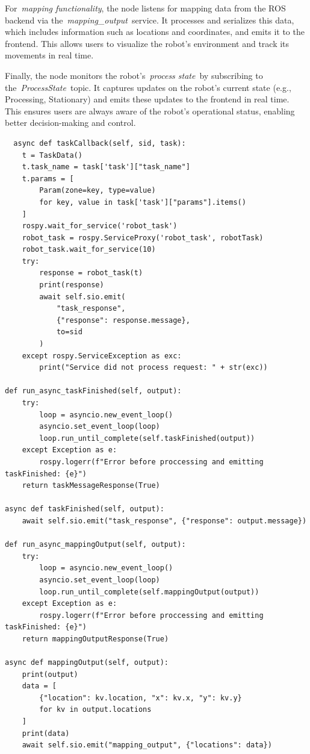 \documentclass[../../main]{subfiles}
\begin{document}
For~\emph{mapping functionality}, the node listens for mapping data from
the ROS backend via the~\emph{mapping\_output}~service. It processes and
serializes this data, which includes information such as locations and
coordinates, and emits it to the frontend. This allows users to
visualize the robot's environment and track its movements in real time.

Finally, the node monitors the robot's~\emph{process state}~by
subscribing to the~\emph{ProcessState}~topic. It captures updates on the
robot's current state (e.g., Processing, Stationary) and emits these
updates to the frontend in real time. This ensures users are always
aware of the robot's operational status, enabling better decision-making
and control.

\begin{codebox}[]{}
  \begin{verbatim}
  async def taskCallback(self, sid, task):
    t = TaskData()
    t.task_name = task['task']["task_name"]
    t.params = [
        Param(zone=key, type=value) 
        for key, value in task['task']["params"].items()
    ]
    rospy.wait_for_service('robot_task')
    robot_task = rospy.ServiceProxy('robot_task', robotTask)
    robot_task.wait_for_service(10)
    try:
        response = robot_task(t)
        print(response)
        await self.sio.emit(
            "task_response", 
            {"response": response.message}, 
            to=sid
        )
    except rospy.ServiceException as exc:
        print("Service did not process request: " + str(exc))

def run_async_taskFinished(self, output):
    try:
        loop = asyncio.new_event_loop()
        asyncio.set_event_loop(loop)
        loop.run_until_complete(self.taskFinished(output))
    except Exception as e:
        rospy.logerr(f"Error before proccessing and emitting taskFinished: {e}")
    return taskMessageResponse(True)

async def taskFinished(self, output):
    await self.sio.emit("task_response", {"response": output.message})

def run_async_mappingOutput(self, output):
    try:
        loop = asyncio.new_event_loop()
        asyncio.set_event_loop(loop)
        loop.run_until_complete(self.mappingOutput(output))
    except Exception as e:
        rospy.logerr(f"Error before proccessing and emitting taskFinished: {e}")
    return mappingOutputResponse(True)

async def mappingOutput(self, output):
    print(output)
    data = [
        {"location": kv.location, "x": kv.x, "y": kv.y} 
        for kv in output.locations
    ]
    print(data)
    await self.sio.emit("mapping_output", {"locations": data})
\end{verbatim}
\end{codebox}
\end{document}
